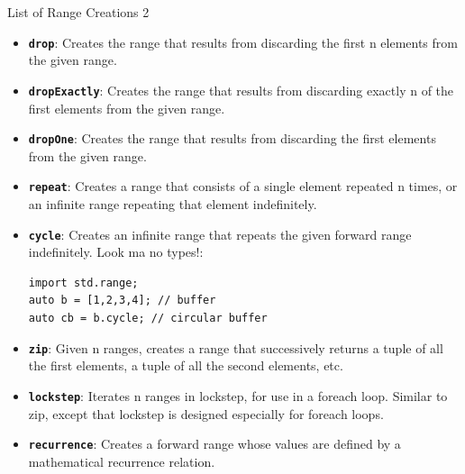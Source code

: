\documentclass[xcolor=dvipsnames]{beamer}
\begin{document}
\begin{frame}[fragile]{List of Range Creations 2}
  \begin{itemize}[<+->]
  \item \textbf{\texttt{drop}}: Creates the range that results from discarding the first
    n elements from the given range.
  \item \textbf{\texttt{dropExactly}}: Creates the range that results from discarding
    exactly n of the first elements from the given range.
  \item \textbf{\texttt{dropOne}}: Creates the range that results from discarding the
    first elements from the given range.
  \item \textbf{\texttt{repeat}}: Creates a range that consists of a single element
    repeated n times, or an infinite range repeating that element indefinitely.
  \item \textbf{\texttt{cycle}}: Creates an infinite range that repeats the given forward
    range indefinitely. Look ma no types!:
    \begin{lstlisting}[frame=single]
import std.range;
auto b = [1,2,3,4]; // buffer
auto cb = b.cycle; // circular buffer
    \end{lstlisting}
  \item \textbf{\texttt{zip}}: Given n ranges, creates a range that successively returns
    a tuple of all the first elements, a tuple of all the second elements, etc.
  \item \textbf{\texttt{lockstep}}: Iterates n ranges in lockstep, for use in a foreach
    loop. Similar to zip, except that lockstep is designed especially for
    foreach loops.
  \item \textbf{\texttt{recurrence}}: Creates a forward range whose values are defined by
    a mathematical recurrence relation.
  \end{itemize}
\end{frame}
\end{document}
